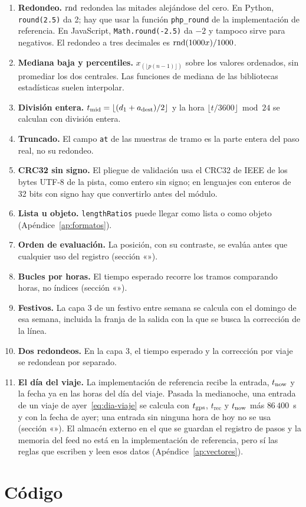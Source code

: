 \begin{enumerate}
  \item \textbf{Redondeo.} $\operatorname{rnd}$ redondea las mitades alejándose del cero. En Python, \texttt{round(2.5)} da 2;
        hay que usar la función \texttt{php\_round} de la implementación de referencia. En JavaScript, \texttt{Math.round(-2.5)} da $-2$
        y tampoco sirve para negativos. El redondeo a tres decimales es $\operatorname{rnd}(1000x)/1000$.
  \item \textbf{Mediana baja y percentiles.} $x_{(\lfloor p(n-1)\rfloor)}$ sobre los valores ordenados, sin promediar los dos
        centrales. Las funciones de mediana de las bibliotecas estadísticas suelen interpolar.
  \item \textbf{División entera.} $t_{\mathrm{mid}}=\lfloor(d_1+a_{\mathrm{dest}})/2\rfloor$ y la hora
        $\lfloor t/3600\rfloor\bmod24$ se calculan con división entera.
  \item \textbf{Truncado.} El campo \texttt{at} de las muestras de tramo es la parte entera del paso real, no su
        redondeo.
  \item \textbf{CRC32 sin signo.} El pliegue de validación usa el CRC32 de IEEE de los bytes UTF-8 de la pista, como
        entero sin signo; en lenguajes con enteros de 32 bits con signo hay que convertirlo antes del módulo.
  \item \textbf{Lista u objeto.} \texttt{lengthRatios} puede llegar como lista o como objeto
        (Apéndice~\ref{ap:formatos}).
  \item \textbf{Orden de evaluación.} La posición, con su contraste, se evalúa antes que cualquier uso del registro
        (sección «»).
  \item \textbf{Bucles por horas.} El tiempo esperado recorre los tramos comparando horas, no índices
        (sección «»).
  \item \textbf{Festivos.} La capa 3 de un festivo entre semana se calcula con el domingo de esa semana, incluida la
        franja de la salida con la que se busca la corrección de la línea.
  \item \textbf{Dos redondeos.} En la capa 3, el tiempo esperado y la corrección por viaje se redondean por separado.
  \item \textbf{El día del viaje.} La implementación de referencia recibe la entrada, $t_{\mathrm{now}}$ y la fecha ya en las horas
        del día del viaje.
        Pasada la medianoche, una entrada de un viaje de ayer~\eqref{eq:dia-viaje} se calcula con $t_{\mathrm{gps}}$,
        $t_{\mathrm{rec}}$ y $t_{\mathrm{now}}$ más $86\,400$~s y con la fecha de ayer; una entrada sin ninguna hora de hoy no se usa
        (sección «»). El almacén externo en el que se guardan el registro de pasos y la memoria del feed no está en la
        implementación de referencia, pero sí las reglas que escriben y leen esos datos (Apéndice~\ref{ap:vectores}).
\end{enumerate}

\section{Código}




